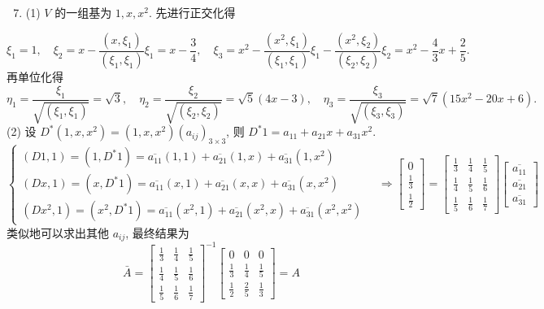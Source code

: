 \documentclass[10pt]{article}
\begin{document}
\begin{enumerate}
  \setcounter{enumi}{6}
  \item (1) $V$  的一组基为  $1, x, x^{2}$.  先进行正交化得 
\end{enumerate}
$$
\xi_{1}=1, \quad \xi_{2}=x-\frac{\left(x, \xi_{1}\right)}{\left(\xi_{1}, \xi_{1}\right)} \xi_{1}=x-\frac{3}{4}, \quad \xi_{3}=x^{2}-\frac{\left(x^{2}, \xi_{1}\right)}{\left(\xi_{1}, \xi_{1}\right)} \xi_{1}-\frac{\left(x^{2}, \xi_{2}\right)}{\left(\xi_{2}, \xi_{2}\right)} \xi_{2}=x^{2}-\frac{4}{3} x+\frac{2}{5} .
$$
 再单位化得 
$$
\eta_{1}=\frac{\xi_{1}}{\sqrt{\left(\xi_{1}, \xi_{1}\right)}}=\sqrt{3}, \quad \eta_{2}=\frac{\xi_{2}}{\sqrt{\left(\xi_{2}, \xi_{2}\right)}}=\sqrt{5}(4 x-3), \quad \eta_{3}=\frac{\xi_{3}}{\sqrt{\left(\xi_{3}, \xi_{3}\right)}}=\sqrt{7}\left(15 x^{2}-20 x+6\right) .
$$
(2)  设  $D^{*}\left(1, x, x^{2}\right)=\left(1, x, x^{2}\right)\left(a_{i j}\right)_{3 \times 3}$,  则  $D^{*} 1=a_{11}+a_{21} x+a_{31} x^{2}$.
$$
\left\{\begin{array}{l}
(D 1,1)=\left(1, D^{*} 1\right)=\overline{a_{11}}(1,1)+\overline{a_{21}}(1, x)+\overline{a_{31}}\left(1, x^{2}\right) \\
(D x, 1)=\left(x, D^{*} 1\right)=\overline{a_{11}}(x, 1)+\overline{a_{21}}(x, x)+\overline{a_{31}}\left(x, x^{2}\right) \\
\left(D x^{2}, 1\right)=\left(x^{2}, D^{*} 1\right)=\overline{a_{11}}\left(x^{2}, 1\right)+\overline{a_{21}}\left(x^{2}, x\right)+\overline{a_{31}}\left(x^{2}, x^{2}\right)
\end{array} \quad \Longrightarrow\left[\begin{array}{l}
0 \\
\frac{1}{3} \\
\frac{1}{2}
\end{array}\right]=\left[\begin{array}{ccc}
\frac{1}{3} & \frac{1}{4} & \frac{1}{5} \\
\frac{1}{4} & \frac{1}{5} & \frac{1}{6} \\
\frac{1}{5} & \frac{1}{6} & \frac{1}{7}
\end{array}\right]\left[\begin{array}{l}
\overline{a_{11}} \\
\overline{a_{21}} \\
\overline{a_{31}}
\end{array}\right]\right.
$$
 类似地可以求出其他  $a_{i j}$,  最终结果为 
$$
\bar{A}=\left[\begin{array}{ccc}
\frac{1}{3} & \frac{1}{4} & \frac{1}{5} \\
\frac{1}{4} & \frac{1}{5} & \frac{1}{6} \\
\frac{1}{5} & \frac{1}{6} & \frac{1}{7}
\end{array}\right]^{-1}\left[\begin{array}{ccc}
0 & 0 & 0 \\
\frac{1}{3} & \frac{1}{4} & \frac{1}{5} \\
\frac{1}{2} & \frac{2}{5} & \frac{1}{3}
\end{array}\right]=A
$$
\end{document}
